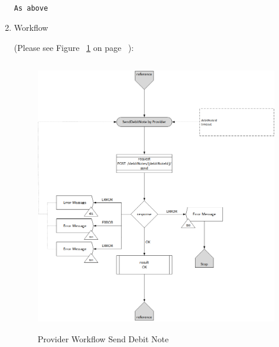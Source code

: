 \begin{enumerate}
\begin{tcolorbox}[boxrule=0pt, frame empty]
\begin{verbatim}

As above

\end{verbatim}
\end{tcolorbox}


\item Workflow

(Please see Figure ~\ref{fig:PSDN} on page ~\pageref{fig:PSDN}):

\begin{figure}[htbp]
    \centering
    \includegraphics[width=12cm,height=12cm,angle=0]{./diag/Workflow/Payment/SendDebitNote-P-Workflow.png}
    \caption{Provider Workflow Send Debit Note }
	\label{fig:PSDN}
\end{figure}


\end{enumerate}

